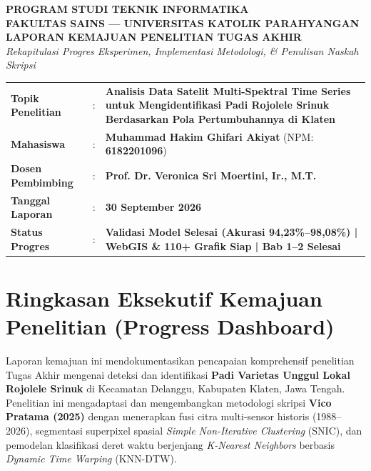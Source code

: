 \documentclass[11pt,a4paper]{article}
\begin{document}
\begin{center}
    {\large\textbf{\color{navyblue}PROGRAM STUDI TEKNIK INFORMATIKA}}\\[2pt]
    {\normalsize\textbf{FAKULTAS SAINS --- UNIVERSITAS KATOLIK PARAHYANGAN}}\\[6pt]
    {\LARGE\bfseries\color{navyblue}LAPORAN KEMAJUAN PENELITIAN TUGAS AKHIR}\\[3pt]
    {\small\textit{Rekapitulasi Progres Eksperimen, Implementasi Metodologi, \& Penulisan Naskah Skripsi}}
\end{center}

\vspace{0.1cm}
\noindent\hrulefill

\vspace{0.2cm}
\noindent
\begin{tabularx}{\textwidth}{@{}llX@{}}
    \textbf{Topik Penelitian} & : & \textbf{Analisis Data Satelit Multi-Spektral Time Series untuk Mengidentifikasi Padi Rojolele Srinuk Berdasarkan Pola Pertumbuhannya di Klaten} \\
    \textbf{Mahasiswa}        & : & \textbf{Muhammad Hakim Ghifari Akiyat} (NPM: \textbf{6182201096}) \\
    \textbf{Dosen Pembimbing} & : & \textbf{Prof. Dr. Veronica Sri Moertini, Ir., M.T.} \\
    \textbf{Tanggal Laporan}  & : & \textbf{30 September 2026} \\
    \textbf{Status Progres}   & : & \textbf{Validasi Model Selesai (Akurasi 94,23\%--98,08\%) | WebGIS \& 110+ Grafik Siap | Bab 1--2 Selesai} \\
\end{tabularx}

\vspace{0.2cm}
\noindent\hrulefill

\section{Ringkasan Eksekutif Kemajuan Penelitian (Progress Dashboard)}

Laporan kemajuan ini mendokumentasikan pencapaian komprehensif penelitian Tugas Akhir mengenai deteksi dan identifikasi \textbf{Padi Varietas Unggul Lokal Rojolele Srinuk} di Kecamatan Delanggu, Kabupaten Klaten, Jawa Tengah. Penelitian ini mengadaptasi dan mengembangkan metodologi skripsi \textbf{Vico Pratama (2025)} dengan menerapkan fusi citra multi-sensor historis (1988--2026), segmentasi superpixel spasial \textit{Simple Non-Iterative Clustering} (SNIC), dan pemodelan klasifikasi deret waktu berjenjang \textit{K-Nearest Neighbors} berbasis \textit{Dynamic Time Warping} (KNN-DTW).
\end{document}
